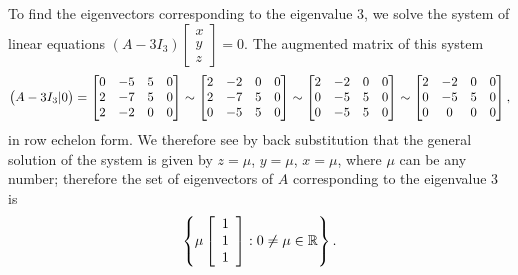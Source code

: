 \documentclass[a4paper]{amsart}
\renewenvironment{solution}{\SolutionInline}{\endSolutionInline}
\begin{document}
\begin{solution}
 To find the eigenvectors corresponding to the eigenvalue $3$, we
 solve the system of linear equations $(A - 3I_3)\left[
 \begin{array}{c}x \\ y\\z
 \end{array} \right] = 0$. The augmented matrix of this system
 $$
 \big(A - 3I_3|0\big) = \left[\begin{matrix} 0 & -5 & 5 &0\\
     2 & -7 & 5 &0\\
     2 & -2 & 0&0\end{matrix}\right] \sim
 \left[\begin{matrix} 2 & -2 & 0 &0\\
     2 & -7 & 5 &0\\
     0 & -5 & 5&0\end{matrix}\right] \sim
 \left[\begin{matrix} 2 & -2 & 0 &0\\
     0 & -5 & 5 &0\\
     0 & -5 & 5&0\end{matrix}\right] \sim
 \left[\begin{matrix} 2 & -2 & 0 &0\\
     0 & -5 & 5 &0\\
     0 & 0 & 0&0\end{matrix}\right],
 $$
 in row echelon form. We therefore see by back substitution that
 the general solution of the system is given by $z = \mu$, $y =
 \mu$, $x = \mu$,  where $\mu$ can be any number; therefore the set
 of eigenvectors of $A$ corresponding to the eigenvalue $3$ is
 $$
 \left\{ \mu \left[ \begin{array}{c} 1\\1\\1
 \end{array} \right] : 0 \neq \mu \in {\mathbb{R}} \right\}.
 $$
\end{solution}
\end{document}
